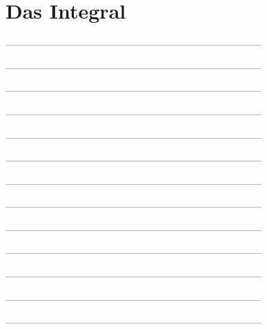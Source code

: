 \setcounter{exercise}{0}

\section{Das Integral}

--------------------------------------------------------------------------------



--------------------------------------------------------------------------------



--------------------------------------------------------------------------------



--------------------------------------------------------------------------------



--------------------------------------------------------------------------------



--------------------------------------------------------------------------------



--------------------------------------------------------------------------------



--------------------------------------------------------------------------------



--------------------------------------------------------------------------------



--------------------------------------------------------------------------------



--------------------------------------------------------------------------------



--------------------------------------------------------------------------------



--------------------------------------------------------------------------------



